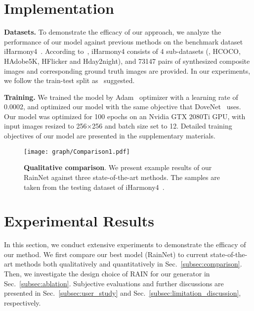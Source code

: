 \documentclass[final]{cvpr}
\begin{document}
\section{Implementation}
\label{sec:implementation}

\noindent
\textbf{Datasets.} To demonstrate the efficacy of our approach, we analyze the performance of our model against previous methods on the benchmark dataset iHarmony4~\cite{cong2020dovenet}. According to~\cite{cong2020dovenet}, iHarmony4 consists of 4 sub-datasets (\ie, HCOCO, HAdobe5K, HFlicker and Hday2night), and 73147 pairs of synthesized composite images and corresponding ground truth images are provided. In our experiments, we follow the train-test split as~\cite{cong2020dovenet} suggested. 

\noindent
\textbf{Training.} We trained the model by Adam~\cite{kingma2014adam} optimizer with a learning rate of 0.0002, and optimized our model with the same objective that DoveNet~\cite{cong2020dovenet} uses. Our model was optimized for 100 epochs on an Nvidia GTX 2080Ti GPU, with input images resized to 256$\times$256 and batch size set to 12. Detailed training objectives of our model are presented in the supplementary materials. 




\begin{figure*}[!htbp]
\begin{center}
\texttt{[image: graph/Comparison1.pdf]}
\end{center}
   \caption{\textbf{Qualitative comparison}. We present example results of our RainNet against three state-of-the-art methods. The samples are taken from the testing dataset of iHarmony4~\cite{cong2020dovenet}. }
   \label{fig:comparison1}
\end{figure*}

\section{Experimental Results}
\label{sec:results}
In this section, we conduct extensive experiments to demonstrate the efficacy of our method. We first compare our best model (RainNet) to current state-of-the-art methods both qualitatively and quantitatively in Sec.~\ref{subsec:comparison}. Then, we investigate the design choice of RAIN for our generator in Sec.~\ref{subsec:ablation}. Subjective evaluations and further discussions are presented in Sec.~\ref{subsec:user_study} and Sec.~\ref{subsec:limitation_discussion}, respectively.
\end{document}
